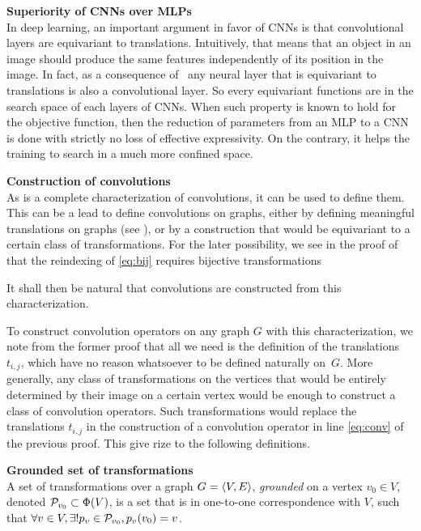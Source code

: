 \begin{remark}\textbf{Superiority of CNNs over MLPs}\\
In deep learning, an important argument in favor of CNNs is that convolutional layers are equivariant to translations. Intuitively, that means that an object in an image should produce the same features independently of its position in the image. In fact, as a consequence of~ any neural layer that is equivariant to translations is also a convolutional layer. So every equivariant functions are in the search space of each layers of CNNs. When such property is known to hold for the objective function, then the reduction of parameters from an MLP to a CNN is done with strictly no loss of effective expressivity. On the contrary, it helps the training to search in a much more confined space.
\end{remark}

\begin{remark}\textbf{Construction of convolutions}\\
As  is a complete characterization of convolutions, it can be used to define them. This can be a lead to define convolutions on graphs, either by defining meaningful translations on graphs (see \secref{}), or by a construction that would be equivariant to a certain class of transformations. For the later possibility, we see in the proof of  that the reindexing of \eqref{eq:bij} requires bijective transformations
\end{remark}


It shall then be natural that convolutions are constructed from this characterization.

To construct convolution operators on any graph $G$ with this characterization, we note from the former proof that all we need is the definition of the translations $t_{i,j}$, which have no reason whatsoever to be defined naturally on~$G$. More generally, any class of transformations on the vertices that would be entirely determined by their image on a certain vertex would be enough to construct a class of convolution operators. Such transformations would replace the translations $t_{i,j}$ in the construction of a convolution operator in line \eqref{eq:conv} of the previous proof. This give rize to the following definitions.

\begin{definition}\textbf{Grounded set of transformations}\\
A set of transformations over a graph $G = \langle V, E \rangle$, \emph{grounded} on a vertex $v_0 \in V$, denoted $\mathcal{P}_{v_0} \subset \Phi(V)$, is a set that is in one-to-one correspondence with $V$, such that $\forall v \in V, \exists! p_v \in \mathcal{P}_{v_0}, p_v(v_0) = v$.
\end{definition}

